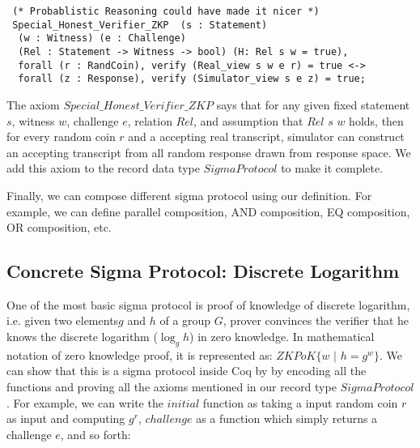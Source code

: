 \begin{verbatim}
 (* Probablistic Reasoning could have made it nicer *)
 Special_Honest_Verifier_ZKP  (s : Statement) 
  (w : Witness) (e : Challenge) 
  (Rel : Statement -> Witness -> bool) (H: Rel s w = true),
  forall (r : RandCoin), verify (Real_view s w e r) = true <->
  forall (z : Response), verify (Simulator_view s e z) = true;

\end{verbatim}

The axiom $Special\_Honest\_Verifier\_ZKP$ says that for any  given 
fixed statement $s$, witness $w$, challenge $e$, relation $Rel$, and assumption that $Rel$ $s$ $w$ holds, 
then for every random coin $r$  and a accepting real transcript, simulator can construct 
an accepting transcript from all random response drawn from response space. 
We add this axiom to the record data type $SigmaProtocol$ to make it 
complete. 

Finally, we can compose different  
sigma protocol using our definition. For example, 
we can define parallel composition, AND composition,
EQ composition, OR composition, etc.

\subsection{Concrete Sigma Protocol: Discrete Logarithm}
\label{sec:conc_sigma}
One of the most basic sigma protocol is proof of knowledge of 
discrete logarithm, i.e. given two elements$g$ and $h$ of 
a group $G$, prover convinces the verifier that 
he knows the discrete logarithm ($\log_g h$) in zero 
knowledge. In mathematical 
notation of zero knowledge proof, it is represented as:
$ZKPoK \lbrace w \text{ | } h = g^w \rbrace$. We can show 
that this is a sigma protocol inside Coq by 
by encoding all the  functions 
and proving all the axioms mentioned in 
our record type $SigmaProtocol$.  For example,
 we can write the $initial$ function as taking a input 
random coin $r$ as input and computing 
$g^r$, $challenge$ as a function which simply returns 
a challenge $e$, and so forth: 


\begin{displayquote}

$\text{initial r := } g^r}$  

$\text{challenge := } e$

$\text{response h w r e := } r + e \cdot w$

$\text{verify h a e z  := } g^z = a \cdot h^e$

$\text{simulator s e z := } (g^z \cdot h^{-e}, e, z)$

$\text{extractor }  $c_{1}$ $z_{1}$ $c_{2}$ $z_{2}$ := (z_{1} - z_{2}) \cdot (c_{2} - c_{1})^{-1}$

\end{displayquote}

